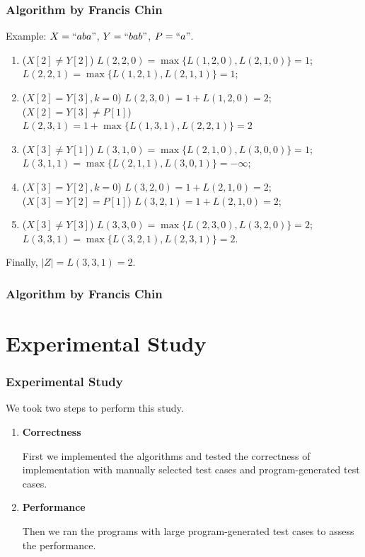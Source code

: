 \documentclass[10pt]{beamer}
\begin{document}
\begin{frame}
  \frametitle{Algorithm by Francis Chin}
  Example: $X=``aba"$, $Y=``bab"$, $P=``a"$.

  \begin{enumerate}
  \addtocounter{enumi}{5}
  \item<2-> ($X[2]\neq Y[2]$) $L(2,2,0) = \max\{L(1,2,0), L(2,1,0)\}=1$;\\ $L(2,2,1)=\max\{L(1,2,1),L(2,1,1)\}=1$;
  \item<3-> ($X[2]=Y[3], k=0$) $L(2,3,0)=1+L(1,2,0) = 2$; \\
    ($X[2]=Y[3]\neq P[1]$) $L(2,3,1) =1+\max\{L(1,3,1),L(2,2,1)\}=2$
  \item<4-> ($X[3]\neq Y[1]$) $L(3,1,0)=\max\{L(2,1,0), L(3,0,0)\}=1$;\\ $L(3,1,1)=\max\{L(2,1,1), L(3,0,1)\}=-\infty$;
  \item<5-> ($X[3]=Y[2], k=0$) $L(3,2,0)=1+ L(2,1,0) = 2$;\\
    ($X[3]=Y[2]=P[1]$) $L(3,2,1)=1+L(2,1,0) = 2$;
  \item<6-> ($X[3]\neq Y[3]$) $L(3,3,0) = \max\{L(2,3,0), L(3,2,0)\} = 2$;\\ $L(3,3,1) = \max\{L(3,2,1), L(2,3,1)\}=2$.
  \end{enumerate}

  \pause\pause\pause\pause\pause\pause
  Finally, $|Z|=L(3,3,1)=2$.

\end{frame}

\begin{frame}
  \frametitle{Algorithm by Francis Chin}

\end{frame}

\section{Experimental Study}
\begin{frame}
  \frametitle{Experimental Study}
We took two steps to perform this study. 
  \begin{enumerate}
    \item<1-> \textbf{Correctness}

First we implemented the algorithms and tested the correctness of implementation with manually selected test cases and program-generated test cases. 
    \item<2-> \textbf{Performance}

Then we ran the programs with large program-generated test cases to assess the performance.
  \end{enumerate}
\end{frame}
\end{document}
